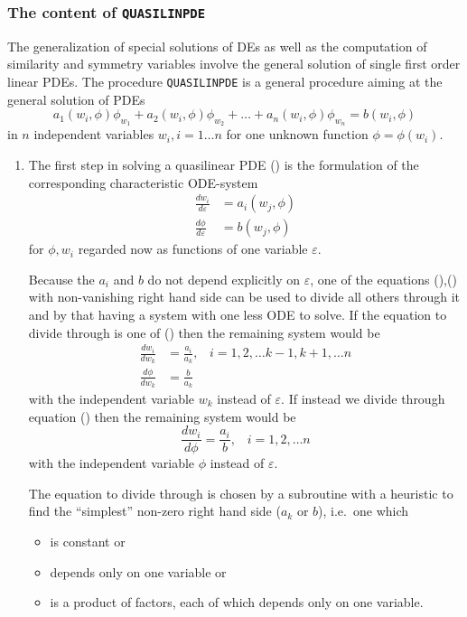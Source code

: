 \subsubsection{The content of \texttt{QUASILINPDE}}
The generalization of special solutions of DEs as well as the computation of
similarity and symmetry variables involve the general solution of single
first order linear PDEs.
The procedure \texttt{QUASILINPDE} is a general procedure
aiming at the general solution of
PDEs
\begin{equation}
   a_1(w_i,\phi)\phi_{w_1} + a_2(w_i,\phi)\phi_{w_2} + \ldots +
   a_n(w_i,\phi)\phi_{w_n} = b(w_i,\phi) \label{PDE}
\end{equation}
in $n$ independent variables $w_i, i=1\ldots n$ for one unknown function
$\phi=\phi(w_i)$.
\begin{enumerate}
\item
The first step in solving a quasilinear PDE ()
is the formulation of the corresponding characteristic ODE-system
\begin{align}
\frac{dw_i}{d\varepsilon} & = a_i(w_j,\phi) \label{char1}   \\
\frac{d\phi}{d\varepsilon} & = b(w_j,\phi)  \label{char2}
\end{align}
for $\phi, w_i$ regarded now as functions of one variable $\varepsilon$.

Because the $a_i$ and $b$ do not depend explicitly on $\varepsilon$, one of the
equations (),() with non-vanishing right hand side
can be used to divide all others through it and by that having a system
with one less ODE to solve.
If the equation to divide through is one of
() then the remaining system would be
\begin{align}
\frac{dw_i}{dw_k} & = \frac{a_i}{a_k} , \;\;\;i=1,2,\ldots k-1,k+1,\ldots n
  \label{char3} \\
\frac{d\phi}{dw_k} & = \frac{b}{a_k}  \label{char4}
\end{align}
with the independent variable $w_k$ instead of $\varepsilon$.
If instead we divide through equation
() then the remaining system would be
\[
\frac{dw_i}{d\phi} = \frac{a_i}{b} , \;\;\;i=1,2,\ldots n
  \label{char3a}
\]
with the independent variable $\phi$ instead of $\varepsilon$.

The equation to divide through is chosen by a
subroutine with a heuristic to find the ``simplest'' non-zero
right hand side ($a_k$ or $b$), i.e.\ one which
\begin{itemize}
\item is constant or
\item depends only on one variable or
\item is a product of factors, each of which depends only on
one variable.
\end{itemize}


\end{enumerate}
